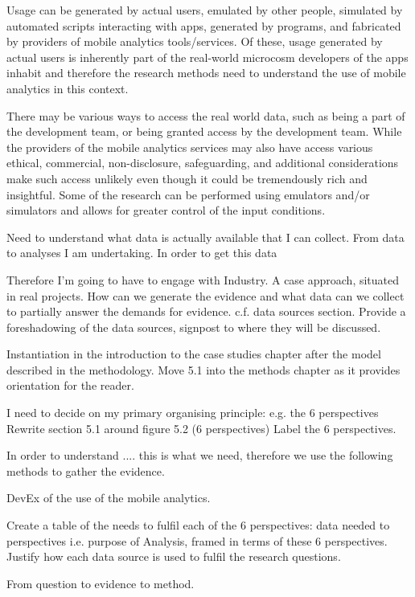 Usage can be generated by actual users, emulated by other people, simulated by automated scripts interacting with apps, generated by programs, and fabricated by providers of mobile analytics tools/services. Of these, usage generated by actual users is inherently part of the real-world microcosm developers of the apps inhabit and therefore the research methods need to understand the use of mobile analytics in this context. 

There may be various ways to access the real world data, such as being a part of the development team, or being granted access by the development team. While the providers of the mobile analytics services may also have access various ethical, commercial, non-disclosure, safeguarding, and additional considerations make such access unlikely even though it could be tremendously rich and insightful. Some of the research can be performed using emulators and/or simulators and allows for greater control of the input conditions.

\dotfill

Need to understand what data is actually available that I can collect.
From data to analyses I am undertaking.
In order to get this data 

Therefore I'm going to have to engage with Industry. A case approach, situated in real projects.
How can we generate the evidence and what data can we collect to partially answer the demands for evidence. c.f. data sources section. Provide a foreshadowing of the data sources, signpost to where they will be discussed.

Instantiation in the introduction to the case studies chapter after the model described in the methodology.
Move 5.1 into the methods chapter as it provides orientation for the reader.

I need to decide on my primary organising principle: e.g. the 6 perspectives
Rewrite section 5.1 around figure 5.2 (6 perspectives) Label the 6 perspectives.

In order to understand .... this is what we need, therefore we use the following methods to gather the evidence.

DevEx of the use of the mobile analytics. 

Create a table of the needs to fulfil each of the 6 perspectives: data needed to perspectives i.e. purpose of Analysis, framed in terms of these 6 perspectives. 
Justify how each data source is used to fulfil the research questions. 

From question to evidence to method.

